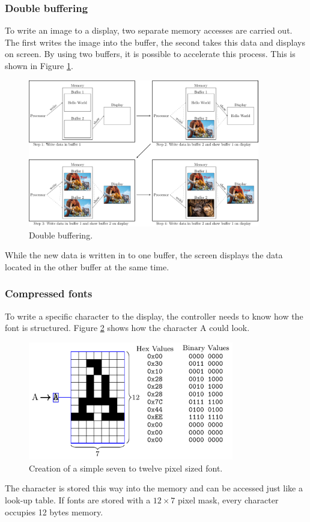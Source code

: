 \subsubsection{Double buffering}
To write an image to a display, two separate memory accesses are carried out.
The first writes the image into the buffer, the second takes this data and displays on screen.
By using two buffers, it is possible to accelerate this process.
This is shown in Figure \ref{theory:buffer}.

\begin{figure}[ht]
	\centering
	\includegraphics[width=0.9\textwidth]{2-theory/drawing-graphics/graphics/buffer.pdf}
	\caption{Double buffering.\label{theory:buffer}}
\end{figure}

While the new data is written in to one buffer, the screen displays the data located in the other buffer at the same time.

\subsubsection{Compressed fonts}\label{theory:CompressedFonts}
To write a specific character to the display, the controller needs to know how the font is structured.
Figure \ref{theory:font12} shows how the character A could look.
\begin{figure}[ht]
	\centering
	\includegraphics[width=0.8\textwidth]{2-theory/drawing-graphics/graphics/font12.pdf}
	\caption{Creation of a simple seven to twelve pixel sized font.\label{theory:font12}}
\end{figure}
The character is stored this way into the memory and can be accessed just like a look-up table.
If fonts are stored with a $12\times 7$ pixel mask, every character occupies 12 bytes memory.

